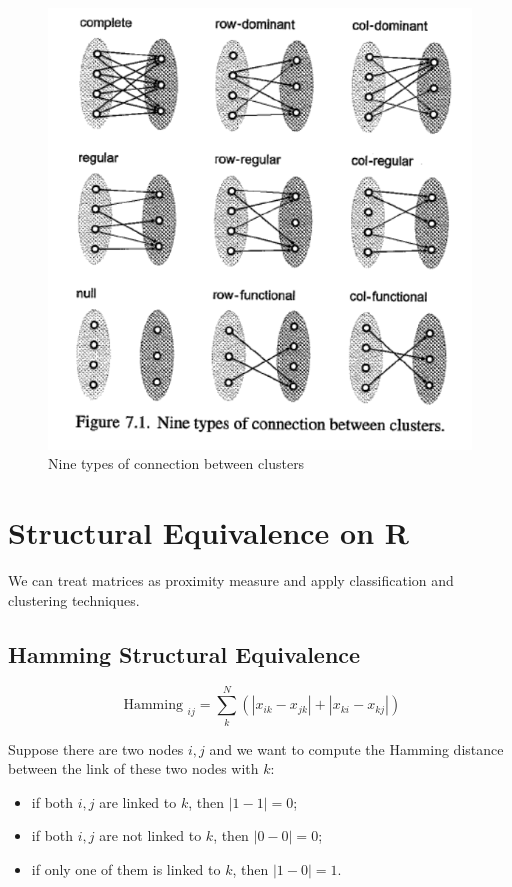 \documentclass[
  notitlepage,
  onecolumn,
  openany]{book}
\providecommand{\tightlist}{%
  \setlength{\itemsep}{0pt}\setlength{\parskip}{0pt}}
\begin{document}
\begin{figure}[h!]

{\centering \includegraphics[width=0.5\linewidth]{images/11-Subgroups and Structural Equivalence/Untitled 5} 

}

\caption{Nine types of connection between clusters}\label{fig:unnamed-chunk-90}
\end{figure}

\hypertarget{structural-equivalence-on-r}{%
\section{Structural Equivalence on R}\label{structural-equivalence-on-r}}

We can treat matrices as proximity measure and apply classification and clustering techniques.

\hypertarget{hamming-structural-equivalence}{%
\subsection{Hamming Structural Equivalence}\label{hamming-structural-equivalence}}

\[
\text { Hamming }_{i j}=\sum_{k}^{N}\left(\left|x_{i k}-x_{j k}\right|+\left|x_{k i}-x_{k j}\right|\right)
\]

Suppose there are two nodes \(i,j\) and we want to compute the Hamming distance between the link of these two nodes with \(k\):

\begin{itemize}
\tightlist
\item
  if both \(i,j\) are linked to \(k\), then \(|1-1| = 0\);
\item
  if both \(i,j\) are not linked to \(k\), then \(|0-0| = 0\);
\item
  if only one of them is linked to \(k\), then \(|1-0| = 1\).
\end{itemize}
\end{document}
